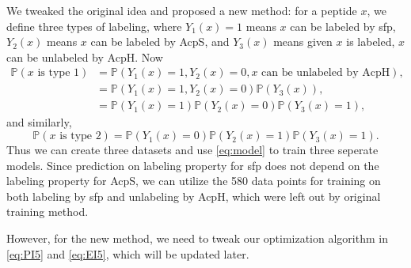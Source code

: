 \documentclass[12pt]{article}
\begin{document}
We tweaked the original idea and proposed a new method: for a peptide $x$, we define three types of labeling, where $Y_1(x) = 1$ means $x$ can be labeled by sfp, $Y_2(x)$ means $x$ can be labeled by AcpS, and $Y_3(x)$ means given $x$ is labeled, $x$ can be unlabeled by AcpH. Now
\begin{equation*}
\begin{split}
\mathbb{P} (\text{$x$ is type 1}) &=\mathbb{P} (Y_1(x) = 1, Y_2(x) = 0, \text{$x$ can be unlabeled by AcpH}),\\
&= \mathbb{P} (Y_1(x) = 1, Y_2(x) = 0) \mathbb{P} (Y_3(x)), \\
&= \mathbb{P} (Y_1(x) = 1) \mathbb{P} (Y_2(x) = 0) \mathbb{P} (Y_3(x) = 1),
\end{split}
\end{equation*}
and similarly,
\begin{equation*}
\mathbb{P} (\text{$x$ is type 2}) = \mathbb{P} (Y_1(x) = 0) \mathbb{P} (Y_2(x) = 1) \mathbb{P} (Y_3(x) = 1).
\end{equation*}
Thus we can create three datasets and use \eqref{eq:model} to train three seperate models. Since prediction on labeling property for sfp does not depend on the labeling property for AcpS, we can utilize the 580 data points for training on both labeling by sfp and unlabeling by AcpH, which were left out by original training method.

However, for the new method, we need to tweak our optimization algorithm in \eqref{eq:PI5} and \eqref{eq:EI5}, which will be updated later.


\end{document}
